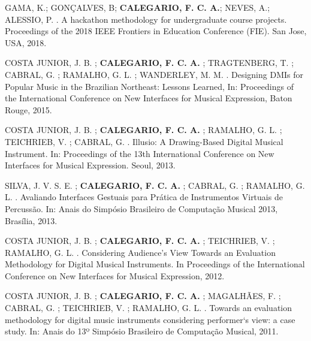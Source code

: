 \begin{cvparagraph}
GAMA, K.; GONÇALVES, B; \textbf{CALEGARIO, F. C. A.}; NEVES, A.; ALESSIO, P. . A hackathon methodology for undergraduate course projects. Proceedings of the 2018 IEEE Frontiers in Education Conference (FIE). San Jose, USA, 2018.
\end{cvparagraph}
\begin{cvparagraph}
COSTA JUNIOR, J. B. ; \textbf{CALEGARIO, F. C. A.} ; TRAGTENBERG, T. ; CABRAL, G. ; RAMALHO, G. L. ; WANDERLEY, M. M. . Designing DMIs for Popular Music in the Brazilian Northeast: Lessons Learned, In: Proceedings of the International Conference on New Interfaces for Musical Expression, Baton Rouge, 2015.
\end{cvparagraph}
\begin{cvparagraph}
COSTA JUNIOR, J. B. ; \textbf{CALEGARIO, F. C. A.} ; RAMALHO, G. L. ; TEICHRIEB, V. ; CABRAL, G. . Illusio: A Drawing-Based Digital Musical Instrument. In: Proceedings of the 13th International Conference on New Interfaces for Musical Expression. Seoul, 2013.
\end{cvparagraph}
\begin{cvparagraph}
SILVA, J. V. S. E. ; \textbf{CALEGARIO, F. C. A.} ; CABRAL, G. ; RAMALHO, G. L. . Avaliando Interfaces Gestuais para Prática de Instrumentos Virtuais de Percussão. In: Anais do Simpósio Brasileiro de Computação Musical 2013, Brasília, 2013.
\end{cvparagraph}
\begin{cvparagraph}
COSTA JUNIOR, J. B. ; \textbf{CALEGARIO, F. C. A.} ; TEICHRIEB, V. ; RAMALHO, G. L. . Considering Audience’s View Towards an Evaluation Methodology for Digital Musical Instruments. In Proceedings of the International Conference on New Interfaces for Musical Expression, 2012.
\end{cvparagraph}
\begin{cvparagraph}
COSTA JUNIOR, J. B. ; \textbf{CALEGARIO, F. C. A.} ; MAGALHÃES, F. ; CABRAL, G. ; TEICHRIEB, V. ; RAMALHO, G. L. . Towards an evaluation methodology for digital music instruments considering performer‘s view: a case study. In: Anais do 13º Simpósio Brasileiro de Computação Musical, 2011.
\end{cvparagraph}
